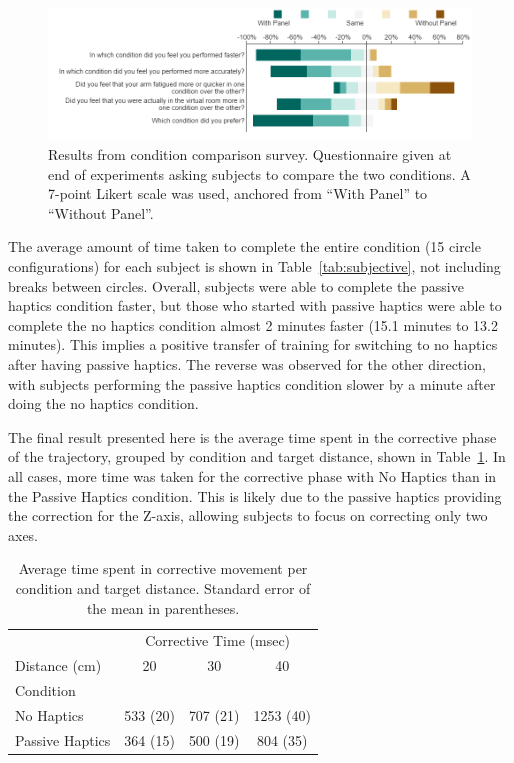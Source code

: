 \documentclass[]{aiaa-tc}%
\begin{document}
\begin{figure}[htb]
  \centering
  \includegraphics{figures/subjective.png}
  \caption{Results from condition comparison survey. Questionnaire given at end of experiments asking subjects to compare the two conditions. A 7-point Likert scale was used, anchored from ``With Panel'' to ``Without Panel''.}
  \label{fig:comparison}
\end{figure}

The average amount of time taken to complete the entire condition (15 circle configurations) for each subject is shown in Table~\ref{tab:subjective}, not including breaks between circles.
Overall, subjects were able to complete the passive haptics condition faster, but those who started with passive haptics were able to complete the no haptics condition almost 2 minutes faster (15.1 minutes to 13.2 minutes).
This implies a positive transfer of training for switching to no haptics after having passive haptics.
The reverse was observed for the other direction, with subjects performing the passive haptics condition slower by a minute after doing the no haptics condition.

The final result presented here is the average time spent in the corrective phase of the trajectory, grouped by condition and target distance, shown in Table~\ref{tab:corrective_time}.
In all cases, more time was taken for the corrective phase with No Haptics than in the Passive Haptics condition.
This is likely due to the passive haptics providing the correction for the Z-axis, allowing subjects to focus on correcting only two axes.

\begin{table}
  \centering
  \begin{tabular}{lccc}
    & \multicolumn{3}{c}{Corrective Time (msec)} \\
    \cline{2-4}
    Distance (cm) & 20 & 30 & 40 \\
    Condition & & & \\
    \hline\hline
    No Haptics &  533 (20) & 707 (21) & 1253 (40) \\
    Passive Haptics & 364 (15) & 500 (19) & 804 (35) \\
  \end{tabular}
  \caption{Average time spent in corrective movement per condition and target distance. Standard error of the mean in parentheses.}
  \label{tab:corrective_time}
\end{table}
\end{document}
